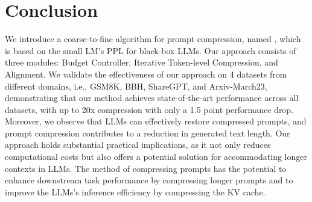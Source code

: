 \section{Conclusion}

We introduce a coarse-to-fine algorithm for prompt compression, named \textit{\sysname{}}, which is based on the small LM's PPL for black-box LLMs. Our approach consists of three modules: Budget Controller, Iterative Token-level Compression, and Alignment. We validate the effectiveness of our approach on 4 datasets from different domains, i.e., GSM8K, BBH, ShareGPT, and Arxiv-March23, demonstrating that our method achieves state-of-the-art performance across all datasets, with up to 20x compression with only a 1.5 point performance drop. Moreover, we observe that LLMs can effectively restore compressed prompts, and prompt compression contributes to a reduction in generated text length. Our approach holds substantial practical implications, as it not only reduces computational costs but also offers a potential solution for accommodating longer contexts in LLMs.
{The method of compressing prompts has the potential to enhance downstream task performance by compressing longer prompts and to improve the LLMs's inference efficiency by compressing the KV cache.}
